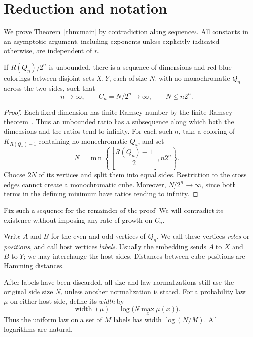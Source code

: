 \section{Reduction and notation}
\label{sec:reduction-and-notation}

We prove Theorem~\ref{thm:main} by contradiction along sequences.
All constants in an asymptotic argument, including exponents unless
explicitly indicated otherwise, are independent of \(n\).

\begin{lemma}\label{lem:counterexample-sequence}
If \(R(Q_n)/2^n\) is unbounded, there is a sequence of dimensions and
red-blue colorings between disjoint sets \(X,Y\), each of size \(N\),
with no monochromatic \(Q_n\) across the two sides, such that
\[
 n\longrightarrow\infty,\qquad C_n=N/2^n\longrightarrow\infty,\qquad N\le n2^n.
\]
\end{lemma}
\begin{proof}
Each fixed dimension has finite Ramsey number by the finite Ramsey
theorem~\cite{ramsey1930}. Thus an unbounded ratio has a subsequence along
which both the dimensions and the ratios tend to infinity. For each such
\(n\), take a coloring of \(K_{R(Q_n)-1}\) containing no monochromatic
\(Q_n\), and set
\[
N=\min\left\{\left\lfloor\frac{R(Q_n)-1}{2}\right\rfloor,
                 n2^n\right\}.
\]
Choose \(2N\) of its vertices and split them into equal sides. Restriction
to the cross edges cannot create a monochromatic cube. Moreover,
\(N/2^n\to\infty\), since both terms in the defining minimum have ratios
tending to infinity.
\end{proof}

Fix such a sequence for the remainder of the proof. We will contradict its
existence without imposing any rate of growth on \(C_n\).

Write \(A\) and \(B\) for the even and odd vertices of \(Q_n\). We call
these vertices \emph{roles} or \emph{positions}, and call host vertices
\emph{labels}. Usually the embedding sends \(A\) to \(X\) and \(B\) to
\(Y\); we may interchange the host sides. Distances between cube positions
are Hamming distances.

After labels have been discarded, all size and law normalizations still
use the original side size \(N\), unless another normalization is stated.
For a probability law \(\mu\) on either host side, define its \emph{width}
by
\[
 \operatorname{width}(\mu)=\log\bigl(N\max_x\mu(x)\bigr).
\]
Thus the uniform law on a set of \(M\) labels has width \(\log(N/M)\).
All logarithms are natural.

